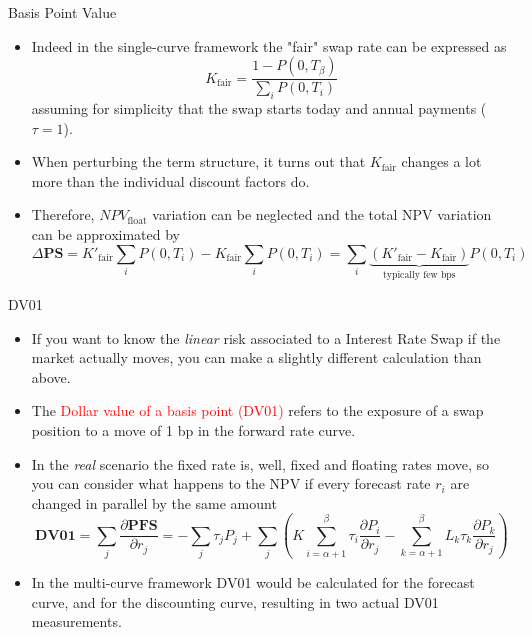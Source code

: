 \documentclass{beamer}
\begin{document}
\begin{frame}{Basis Point Value}
\begin{itemize}
	\item<1-> Indeed in the single-curve framework the "fair" swap rate  can be expressed as 
	\begin{equation*}
		K_{\text{fair}}=\frac{1-P(0, T_\beta)}{\sum_i P(0, T_i)}
	\end{equation*} 
	assuming for simplicity that the swap starts today and annual payments ($\tau = 1$).
	\item<2-> When perturbing the term structure, it turns out that $K_{\text{fair}}$ changes a lot more than the individual discount factors do. 
	\item<3-> Therefore, $NPV_{\text{float}}$ variation can be neglected and the total NPV variation can be approximated by
	\begin{equation*}
	\Delta\textbf{PS} = K'_{\text{fair}}\sum_i P(0, T_i) - K_{\text{fair}}\sum_i P(0, T_i) = \sum_i \underbrace{(K'_{\text{fair}} - K_{\text{fair}})}_{\text{typically few bps}}P(0, T_i) \end{equation*}
\end{itemize}
\end{frame}

\begin{frame}{DV01}
\begin{itemize}
	\item<1-> If you want to know the \emph{linear} risk associated to a Interest Rate Swap if the market actually moves, you can make a slightly different calculation than above.
	\item<2-> The \textcolor{red}{Dollar value of a basis point (DV01)} refers to the exposure of a swap position to a move of 1 bp in the forward rate curve.
	\item<3-> In the \emph{real} scenario the fixed rate is, well, fixed and floating rates move, so you can consider what happens to the NPV if every forecast rate $r_i$ are changed in parallel by the same amount
	\begin{equation*}
	\textbf{DV01} = \sum_j \frac{\partial \textbf{PFS}}{\partial r_j} = -\sum_{j}\tau_jP_j+\sum_{j}\left(K\sum_{i=\alpha+1}^\beta\tau_i\frac{\partial P_i}{\partial r_j} - \sum_{k=\alpha+1}^\beta L_k\tau_k\frac{\partial P_k}{\partial r_j}\right)
	\end{equation*}
	\item<4-> In the multi-curve framework DV01 would be calculated for the forecast curve, and for the discounting curve, resulting in two actual DV01 measurements.
\end{itemize}
\end{frame}
\end{document}
